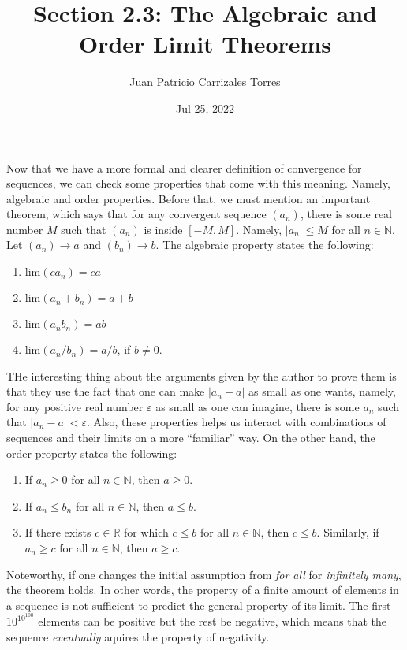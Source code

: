 \documentclass[12pt]{article}
\newcommand{\N}{\mathbb{N}}
\newcommand{\R}{\mathbb{R}}
\newcommand{\Lim}[1]{\mathrm{lim}(#1)}
\begin{document}
  
\title{Section 2.3: The Algebraic and Order Limit Theorems}
   \author{Juan Patricio Carrizales Torres}
     \date{Jul 25, 2022}
       \maketitle 
       Now that we have a more formal and clearer definition of convergence for sequences, we can check some properties that come with this meaning. Namely, algebraic and order properties. Before that, we must mention an important theorem, which says that for any convergent sequence $(a_{n})$, there is some real number $M$ such that $(a_{n})$ is inside $[-M,M]$. Namely, $|a_{n}|\leq M$ for all $n\in \N$.
       Let $(a_{n})\to a$ and $(b_{n})\to b$. The algebraic property states the following: 
       \begin{enumerate}[label=(\roman*)]
	 \item $\Lim{ca_{n}} = ca$
	 \item $\Lim{a_{n}+b_{n}} = a + b$
	 \item $\Lim{a_{n}b_{n}} = ab$
	 \item $\Lim{a_{n}/b_{n}} = a/b$, if $b\neq0$.
    \end{enumerate}
    THe interesting thing about the arguments given by the author to prove them is that they use the fact that one can make $|a_{n} -a|$ as small as one wants, namely, for any positive real number $\varepsilon$ as small as one can imagine, there is some $a_{n}$ such that $|a_{n}-a|<\varepsilon$. Also, these properties helps us interact with combinations of sequences and their limits on a more ``familiar'' way. On the other hand, the order property states the following:
       \begin{enumerate}[label=(\roman*)]
	 \item If $a_{n}\geq 0$ for all $n\in \N$, then $a\geq0$.
	 \item If $a_{n}\leq b_{n}$ for all $n\in\N$, then $a\leq b$.
	 \item If there exists $c\in \R$ for which $c\leq b$ for all $n\in \N$, then $c\leq b$. Similarly, if $a_{n}\geq c$ for all $n\in \N$, then $a\geq c$. 
    \end{enumerate}
    Noteworthy, if one changes the initial assumption from \textit{for all} for \textit{infinitely many}, the theorem holds. In other words, the property of a finite amount of elements in a sequence is not sufficient to predict the general property of its limit. The first $10^{10^{100}}$ elements can be positive but the rest be negative, which means that the sequence \textit{eventually} aquires the property of negativity. 
\end{document}
